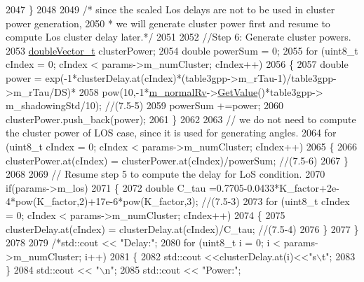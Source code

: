 \begin{DoxyCode}
2047         \}
2048 
2049         \textcolor{comment}{/* since the scaled Los delays are not to be used in cluster power generation,}
2050 \textcolor{comment}{         * we will generate cluster power first and resume to compute Los cluster delay later.*/}
2051 
2052         \textcolor{comment}{//Step 6: Generate cluster powers.}
2053         \hyperlink{namespacens3_aa6f1edf6566ca6afec613bc6e40240ea}{doubleVector\_t} clusterPower;
2054         \textcolor{keywordtype}{double} powerSum = 0;
2055         \textcolor{keywordflow}{for} (uint8\_t cIndex = 0; cIndex < params->m\_numCluster; cIndex++)
2056         \{
2057                 \textcolor{keywordtype}{double} power = exp(-1*clusterDelay.at(cIndex)*(table3gpp->m\_rTau-1)/table3gpp->m\_rTau/DS)*
2058                                 pow(10,-1*\hyperlink{classns3_1_1MmWave3gppChannel_ac2e02ebacc72ed96518d785f2dc87c57}{m\_normalRv}->\hyperlink{classns3_1_1NormalRandomVariable_a0134d131477bc439cc6ff7cbe84b03a9}{GetValue}()*table3gpp->
      m\_shadowingStd/10); \textcolor{comment}{//(7.5-5)}
2059                 powerSum +=power;
2060                 clusterPower.push\_back(power);
2061         \}
2062 
2063         \textcolor{comment}{// we do not need to compute the cluster power of LOS case, since it is used for generating angles.}
2064         \textcolor{keywordflow}{for} (uint8\_t cIndex = 0; cIndex < params->m\_numCluster; cIndex++)
2065         \{
2066                 clusterPower.at(cIndex) = clusterPower.at(cIndex)/powerSum; \textcolor{comment}{//(7.5-6)}
2067         \}
2068 
2069         \textcolor{comment}{// Resume step 5 to compute the delay for LoS condition.}
2070         \textcolor{keywordflow}{if}(params->m\_los)
2071         \{
2072                 \textcolor{keywordtype}{double} C\_tau =0.7705-0.0433*K\_factor+2e-4*pow(K\_factor,2)+17e-6*pow(K\_factor,3); \textcolor{comment}{//(7.5-3)}
2073                 \textcolor{keywordflow}{for} (uint8\_t cIndex = 0; cIndex < params->m\_numCluster; cIndex++)
2074                 \{
2075                         clusterDelay.at(cIndex) = clusterDelay.at(cIndex)/C\_tau; \textcolor{comment}{//(7.5-4)}
2076                 \}
2077         \}
2078 
2079         \textcolor{comment}{/*std::cout << "Delay:";}
2080 \textcolor{comment}{        for (uint8\_t i = 0; i < params->m\_numCluster; i++)}
2081 \textcolor{comment}{        \{}
2082 \textcolor{comment}{                std::cout <<clusterDelay.at(i)<<"s\(\backslash\)t";}
2083 \textcolor{comment}{        \}}
2084 \textcolor{comment}{        std::cout << "\(\backslash\)n";}
2085 \textcolor{comment}{        std::cout << "Power:";}

\end{DoxyCode}

